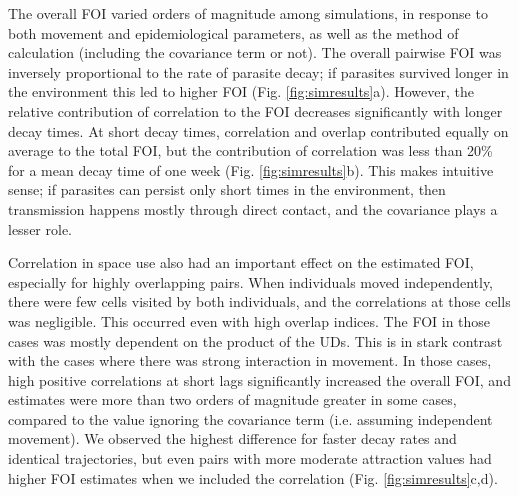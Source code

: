 \documentclass[letterpaper]{article}
\begin{document}
The overall FOI varied orders of magnitude among simulations, in response to both movement and epidemiological parameters, as well as the method of calculation (including the covariance term or not). 
The overall pairwise FOI was inversely proportional to the rate of parasite decay; if parasites survived  longer in the environment this led to higher FOI (Fig. \ref{fig:simresults}a). However, the relative contribution of correlation to the FOI decreases significantly with longer decay times. At short decay times, correlation and overlap contributed equally on average to the total FOI, but the contribution of correlation was less than 20\% for a mean decay time of one week (Fig. \ref{fig:simresults}b).  This makes intuitive sense; if parasites can persist only short times in the environment, then transmission happens mostly through direct contact, and the covariance plays a lesser role. 


Correlation in space use also had an important effect on the estimated FOI, especially for highly overlapping pairs. 
When individuals moved independently, there were few cells visited by both individuals, and the correlations at those cells was negligible. This occurred even with high overlap indices. The FOI in those cases was mostly dependent on the product of the UDs. %
This is in stark contrast with the cases where there was strong interaction in movement. 
In those cases, high positive correlations at short lags significantly increased the overall FOI, and estimates were more than two orders of magnitude greater in some cases, compared to the value ignoring the covariance term (i.e. assuming independent movement). We observed the highest difference for faster decay rates and identical trajectories, but even pairs with more moderate attraction values had higher FOI estimates when we included the correlation (Fig. \ref{fig:simresults}c,d).
\end{document}
